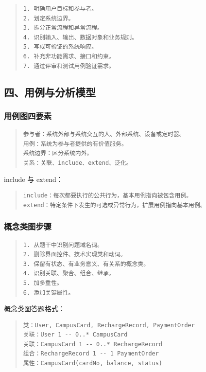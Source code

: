 \documentclass[UTF8,zihao=-4]{ctexart}
\begin{document}
\begin{quote}
\footnotesize
\begin{verbatim}
1. 明确用户目标和参与者。
2. 划定系统边界。
3. 拆分正常流程和异常流程。
4. 识别输入、输出、数据对象和业务规则。
5. 写成可验证的系统响应。
6. 补充非功能需求、接口和约束。
7. 通过评审和测试用例验证需求。
\end{verbatim}
\end{quote}


\subsection{四、用例与分析模型}


\subsubsection{用例图四要素}


\begin{quote}
\footnotesize
\begin{verbatim}
参与者：系统外部与系统交互的人、外部系统、设备或定时器。
用例：系统为参与者提供的有价值服务。
系统边界：区分系统内外。
关系：关联、include、extend、泛化。
\end{verbatim}
\end{quote}


include 与 extend：


\begin{quote}
\footnotesize
\begin{verbatim}
include：每次都要执行的公共行为，基本用例指向被包含用例。
extend：特定条件下发生的可选或异常行为，扩展用例指向基本用例。
\end{verbatim}
\end{quote}


\subsubsection{概念类图步骤}


\begin{quote}
\footnotesize
\begin{verbatim}
1. 从题干中识别问题域名词。
2. 删除界面控件、技术实现类和动词。
3. 保留有状态、有业务意义、有关系的概念类。
4. 识别关联、聚合、组合、继承。
5. 加多重性。
6. 添加关键属性。
\end{verbatim}
\end{quote}


概念类图答题格式：


\begin{quote}
\footnotesize
\begin{verbatim}
类：User, CampusCard, RechargeRecord, PaymentOrder
关联：User 1 -- 0..* CampusCard
关联：CampusCard 1 -- 0..* RechargeRecord
组合：RechargeRecord 1 -- 1 PaymentOrder
属性：CampusCard(cardNo, balance, status)
\end{verbatim}
\end{quote}
\end{document}
